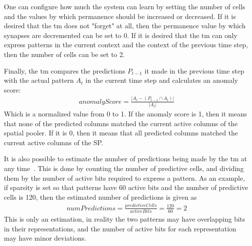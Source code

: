 One can configure how much the system can learn by setting the number of cells and the values by which permanence should be increased or decreased. If it is desired that the \gls*{tm} does not "forget" at all, then the permanence value by which synapses are decremented can be set to 0. If it is desired that the \gls*{tm} can only express patterns in the current context and the context of the previous time step, then the number of cells can be set to 2.
\par
Finally, the \gls*{tm} compares the predictions $P_{t-1}$ it made in the previous time step with the actual pattern $A_t$ in the current time step and calculates an anomaly score:
\begin{align*}
    anomalyScore=\frac{|A_t-(P_{t-1}\cap A_t)|}{|A_t|}
\end{align*}
Which is a normalized value from 0 to 1. If the anomaly score is 1, then it means that none of the predicted columns matched the current active columns of the spatial pooler. If it is 0, then it means that all predicted columns matched the current active columns of the SP.\par
It is also possible to estimate the number of predictions being made by the \gls*{tm} at any time~\cite{htm_predictions_count}. This is done by counting the number of predictive cells, and dividing them by the number of active bits required to express a pattern. As an example, if sparsity is set so that patterns have 60 active bits and the number of predictive cells is 120, then the estimated number of predictions is given as
\begin{align*}
    numPredictions=\frac{predictiveCells}{activeBits}=\frac{120}{60}=2
\end{align*}
This is only an estimation, in reality the two patterns may have overlapping bits in their representations, and the number of active bits for each representation may have minor deviations.
